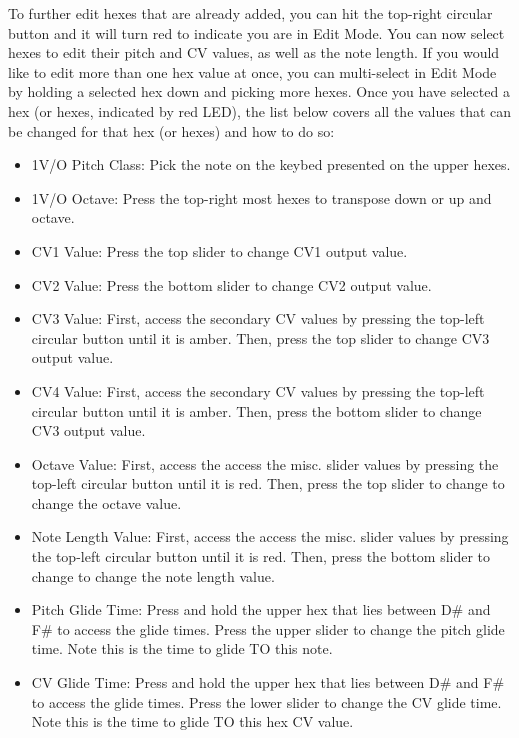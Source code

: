   To further edit hexes that are already added, you can hit the top-right circular button
  and it will turn red to indicate you are in Edit Mode. You can now select hexes to edit
  their pitch and CV values, as well as the note length. If you would like to edit more
  than one hex value at once, you can multi-select in Edit Mode by holding a selected hex
  down and picking more hexes. Once you have selected a hex (or hexes, indicated by
  red LED), the list below covers all the values that can be changed for that
  hex (or hexes) and how to do so:
  \begin{itemize}
    \item 1V/O Pitch Class: Pick the note on the keybed presented
    on the upper hexes.
    \item 1V/O Octave: Press the top-right most hexes to transpose
    down or up and octave.

    \item CV1 Value: Press the top slider to change CV1 output value.
    \item CV2 Value: Press the bottom slider to change CV2 output value.
    \item CV3 Value: First, access the secondary CV values by pressing the top-left
    circular button until it is amber.
    Then, press the top slider to change CV3 output value.
    \item CV4 Value: First, access the secondary CV values by pressing the top-left
    circular button until it is amber.
    Then, press the bottom slider to change CV3 output value.

    \item Octave Value: First, access the access the misc. slider values by pressing
    the top-left circular button until it is red.
    Then, press the top slider to change to change the octave value.
    \item Note Length Value: First, access the access the misc. slider values by pressing
    the top-left circular button until it is red.
    Then, press the bottom slider to change to change the note length value.

    \item Pitch Glide Time: Press and hold the upper hex that lies between D\#
    and F\# to access the glide times. Press the upper slider to change the pitch
    glide time. Note this is the time to glide TO this note.
    \item CV Glide Time: Press and hold the upper hex that lies between D\#
    and F\# to access the glide times. Press the lower slider to change the CV
    glide time. Note this is the time to glide TO this hex CV value.
  \end{itemize}

